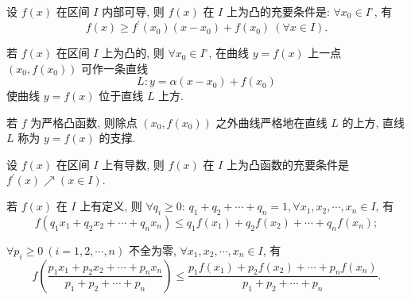 \begin{inference}
    设 $ f(x) $ 在区间 $ I $ 内部可导, 则 $ f(x) $ 在 $ I $ 上为凸的充要条件是: $ \forall x_{0} \in I^{\circ}$, 有
    $$f(x) \geqslant f^{\prime}\left(x_{0}\right)\left(x-x_{0}\right)+f\left(x_{0}\right)~ (\forall x \in I) .$$
\end{inference}

\begin{inference}
    若 $ f(x) $ 在区间 $ I $ 上为凸的, 则 $ \forall x_{0} \in I^{\circ}$, 在曲线 $ y=f(x) $ 上一点 $ \left(x_{0}\right. ,  \left.f\left(x_{0}\right)\right)$ 可作一条直线
    $$L: y=\alpha\left(x-x_{0}\right)+f\left(x_{0}\right)$$
    使曲线 $ y=f(x) $ 位于直线 $ L $ 上方.
\end{inference}

\begin{theorem}[分离性定理]
    若 $ f $ 为严格凸函数, 则除点 $ \left(x_{0}, f\left(x_{0}\right)\right) $ 之外曲线严格地在直线 $ L $ 的上方, 直线 $ L $ 称为 $ y=f(x) $ 的支撑.
\end{theorem}

\begin{theorem}
    设 $ f(x) $ 在区间 $ I $ 上有导数, 则 $ f(x) $ 在 $ I $ 上为凸函数的充要条件是 $ f^{\prime}(x) \nearrow(x \in I) .$
\end{theorem}

\begin{theorem}
    若 $f(x)$ 在 $I$ 上有定义, 则
    $\forall q_{i} \geqslant 0$: $q_{1}+q_{2}+\cdots+q_{n}=1, \forall x_{1}, x_{2}, \cdots, x_{n} \in I$, 有
    $$f\left(q_{1} x_{1}+q_{2} x_{2}+\cdots+q_{n} x_{n}\right) \leqslant q_{1} f\left(x_{1}\right)+q_{2} f\left(x_{2}\right)+\cdots+q_{n} f\left(x_{n}\right);$$

    $\forall p_{i} \geqslant 0~ (i=1,2, \cdots, n)$ 不全为零, $\forall x_{1}, x_{2}, \cdots, x_{n} \in I$, 有
    $$f\left(\frac{p_{1} x_{1}+p_{2} x_{2}+\cdots+p_{n} x_{n}}{p_{1}+p_{2}+\cdots+p_{n}}\right) \leqslant \frac{p_{1} f\left(x_{1}\right)+p_{2} f\left(x_{2}\right)+\cdots+p_{n} f\left(x_{n}\right)}{p_{1}+p_{2}+\cdots+p_{n}} .$$
\end{theorem}

